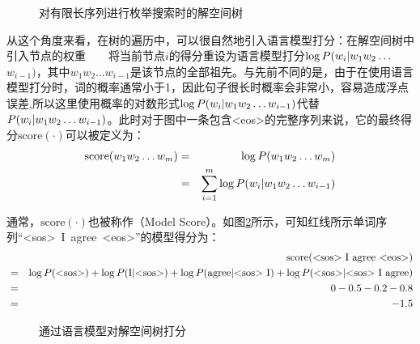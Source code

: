 \begin{figure}[htp]
    \centering
 	
	\caption{对有限长序列进行枚举搜索时的解空间树}
    \label{fig:2-13}
\end{figure}

\parinterval 从这个角度来看，在树的遍历中，可以很自然地引入语言模型打分：在解空间树中引入节点的权重\ \ \dash\ \ 将当前节点$i$的得分重设为语言模型打分$\log {P}(w_i | w_1 w_2 \ldots $\\$ w_{i-1})$，其中$w_1 w_2 \ldots w_{i-1}$是该节点的全部祖先。与先前不同的是，由于在使用语言模型打分时，词的概率通常小于1，因此句子很长时概率会非常小，容易造成浮点误差,所以这里使用概率的对数形式$\log {P}(w_i | w_1 w_2 \ldots w_{i-1})$代替${P}(w_i | w_1 w_2 \ldots w_{i-1})$。此时对于图中一条包含<eos>的完整序列来说，它的最终得分$\textrm{score}(\cdot)$可以被定义为：
\begin{eqnarray}
\textrm{score}(w_1 w_2 \ldots w_m) & = & \log {P}(w_1 w_2 \ldots w_m) \nonumber \\
                                   & = & \sum_{i=1}^{m}\log {P}(w_i | w_1 w_2 \ldots w_{i-1})
\label{eq:2-43}
\end{eqnarray}

\parinterval 通常，$\textrm{score}(\cdot)$也被称作{\small{}}（Model Score）。如图\ref{fig:2-14}所示，可知红线所示单词序列“<sos>\ I\ agree\ <eos>”的模型得分为：
\begin{eqnarray}
&&\textrm{score(<sos>\ I\ agree\ <eos>)}   \nonumber \\
& = & \log \funp{P}(\textrm{<sos>}) + \log \funp{P}(\textrm{I} | \textrm{<sos>}) + \log \funp{P}(\textrm{agree} | \textrm{<sos>\ I}) + \log \funp{P}(\textrm{<sos>}| \textrm{<sos>\ I\ agree})   \nonumber \\
& = & 0-0.5-0.2-0.8   \nonumber \\
& = & -1.5
\label{eq:2-44}
\end{eqnarray}

\begin{figure}[htp]
    \centering
 	
	\caption{通过语言模型对解空间树打分}
    \label{fig:2-14}
\end{figure}

